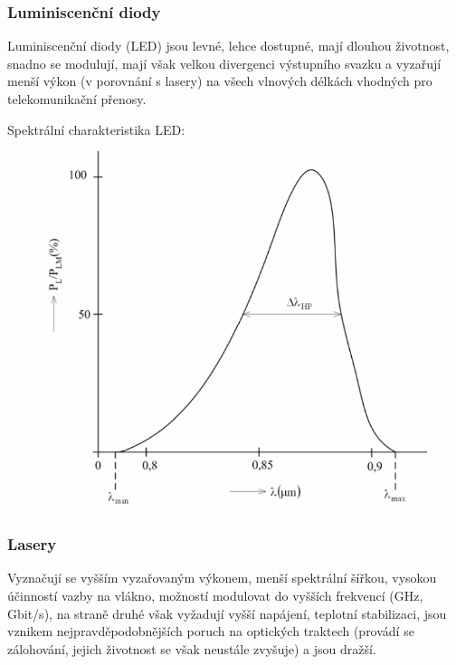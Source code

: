 \subsubsection{Luminiscenční diody}
Luminiscenční diody (LED) jsou levné, lehce dostupné, mají dlouhou životnost, snadno se modulují, mají však velkou divergenci výstupního svazku a vyzařují menší výkon (v porovnání s lasery) na všech vlnových délkách vhodných pro telekomunikační přenosy.\newpage

Spektrální charakteristika LED: 

\begin{figure}[!ht]
\begin{center}
    \includegraphics[scale=0.55]{obrazky/spektrLED.png}
  \end{center}
\end{figure}

\subsubsection{Lasery}
Vyznačují se vyšším vyzařovaným výkonem, menší spektrální šířkou, vysokou účinností vazby na vlákno, možností modulovat do vyšších frekvencí (GHz, Gbit/s), na straně druhé však vyžadují vyšší napájení, teplotní stabilizaci, jsou vznikem nejpravděpodobnějších poruch na optických traktech (provádí se zálohování, jejich životnost se však neustále zvyšuje) a jsou dražší. 


